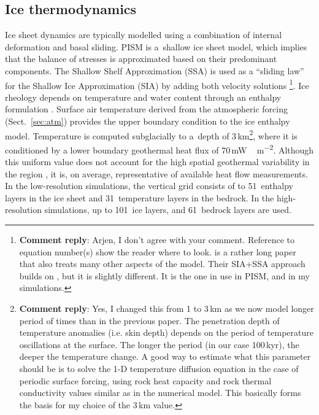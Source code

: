 \documentclass[tc, manuscript]{copernicus}
\newcommand{\renote}[1]{\footnote{\textbf{Comment reply}: #1}}
\begin{document}
\subsection{Ice thermodynamics}
\label{sec:icedyn}

Ice sheet dynamics are typically modelled using a combination of internal
deformation and basal sliding. PISM is a~shallow ice sheet model, which implies
that the balance of stresses is approximated based on their predominant
components. The Shallow Shelf Approximation (SSA) is used as a ``sliding law''
for the Shallow Ice Approximation (SIA) by adding both velocity solutions
\citep[Eqns.~7--9 and 15]{Bueler.Brown.2009, Winkelmann.etal.2011}\renote{
    Arjen, I don't agree with your comment. Reference to equation number(s)
    show the reader where to look. \citet{Winkelmann.etal.2011} is a rather
    long paper that also treats many other aspects of the model. Their SIA+SSA
    approach builds on \citep{Bueler.Brown.2009}, but it is slightly different.
    It is the one in use in PISM, and in my simulations.}.
Ice rheology depends on temperature and water content through an enthalpy
formulation \citep{Aschwanden.etal.2012}. Surface air temperature derived from
the atmospheric forcing (Sect.~\ref{sec:atm}) provides the upper boundary
condition to the ice enthalpy model. Temperature is computed subglacially to
a~depth of 3\,km\renote{
    Yes, I changed this from 1 to 3\,km as we now model longer period of times
    than in the previous paper. The penetration depth of temperature anomalies
    (i.e. skin depth) depends on the period of temperature oscillations at the
    surface. The longer the period (in our case 100\,kyr), the deeper the
    temperature change. A good way to estimate what this parameter should be is
    to solve the 1-D temperature diffusion equation in the case of periodic
    surface forcing, using rock heat capacity and rock thermal conductivity
    values similar as in the numerical model. This basically forms the basis
    for my choice of the 3\,km value.},
where it is conditioned by a lower boundary geothermal heat flux of
70\,\unit{mW\,m^{-2}}. Although this uniform value does not account for the
high spatial geothermal variability in the region
\citep{Blackwell.Richards.2004}, it is, on average, representative of available
heat flow measurements. In the low-resolution simulations, the vertical grid
consists of to 51~enthalpy layers in the ice sheet and 31~temperature layers in
the bedrock. In the high-resolution simulations, up to 101~ice layers, and
61~bedrock layers are used.
\end{document}
